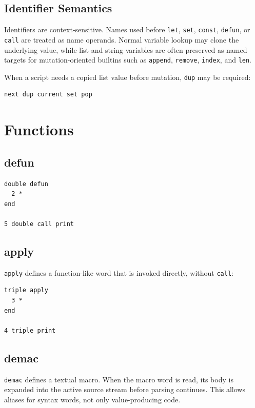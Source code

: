 \documentclass[11pt,a4paper]{article}
\newcommand{\code}[1]{\texttt{#1}}
\begin{document}
\subsection{Identifier Semantics}

Identifiers are context-sensitive. Names used before \code{let},
\code{set}, \code{const}, \code{defun}, or \code{call} are treated as name
operands. Normal variable lookup may clone the underlying value, while
list and string variables are often preserved as named targets for
mutation-oriented builtins such as \code{append}, \code{remove},
\code{index}, and \code{len}.

When a script needs a copied list value before mutation, \code{dup} may be
required:

\begin{lstlisting}[language=Raden]
next dup current set pop
\end{lstlisting}

\section{Functions}

\subsection{defun}

\begin{lstlisting}[language=Raden]
double defun
  2 *
end

5 double call print
\end{lstlisting}

\subsection{apply}

\code{apply} defines a function-like word that is invoked directly,
without \code{call}:

\begin{lstlisting}[language=Raden]
triple apply
  3 *
end

4 triple print
\end{lstlisting}

\subsection{demac}

\code{demac} defines a textual macro. When the macro word is read, its
body is expanded into the active source stream before parsing continues.
This allows aliases for syntax words, not only value-producing code.
\end{document}
